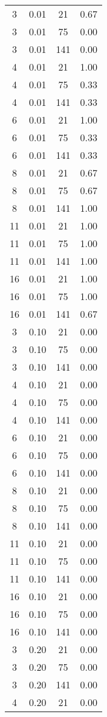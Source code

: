 \documentclass[10pt,a4paper]{article}
\begin{document}
\begin{center}
\begin{longtable}{cccc}
3  & 0.01 & 21  & 0.67 \\
3  & 0.01 & 75  & 0.00 \\
3  & 0.01 & 141 & 0.00 \\
4  & 0.01 & 21  & 1.00 \\
4  & 0.01 & 75  & 0.33 \\
4  & 0.01 & 141 & 0.33 \\
6  & 0.01 & 21  & 1.00 \\
6  & 0.01 & 75  & 0.33 \\
6  & 0.01 & 141 & 0.33 \\
8  & 0.01 & 21  & 0.67 \\
8  & 0.01 & 75  & 0.67 \\
8  & 0.01 & 141 & 1.00 \\
11 & 0.01 & 21  & 1.00 \\
11 & 0.01 & 75  & 1.00 \\
11 & 0.01 & 141 & 1.00 \\
16 & 0.01 & 21  & 1.00 \\
16 & 0.01 & 75  & 1.00 \\
16 & 0.01 & 141 & 0.67 \\
3  & 0.10 & 21  & 0.00 \\
3  & 0.10 & 75  & 0.00 \\
3  & 0.10 & 141 & 0.00 \\
4  & 0.10 & 21  & 0.00 \\
4  & 0.10 & 75  & 0.00 \\
4  & 0.10 & 141 & 0.00 \\
6  & 0.10 & 21  & 0.00 \\
6  & 0.10 & 75  & 0.00 \\
6  & 0.10 & 141 & 0.00 \\
8  & 0.10 & 21  & 0.00 \\
8  & 0.10 & 75  & 0.00 \\
8  & 0.10 & 141 & 0.00 \\
11 & 0.10 & 21  & 0.00 \\
11 & 0.10 & 75  & 0.00 \\
11 & 0.10 & 141 & 0.00 \\
16 & 0.10 & 21  & 0.00 \\
16 & 0.10 & 75  & 0.00 \\
16 & 0.10 & 141 & 0.00 \\
3  & 0.20 & 21  & 0.00 \\
3  & 0.20 & 75  & 0.00 \\
3  & 0.20 & 141 & 0.00 \\
4  & 0.20 & 21  & 0.00 \\

\end{longtable}
\end{center}
\end{document}
